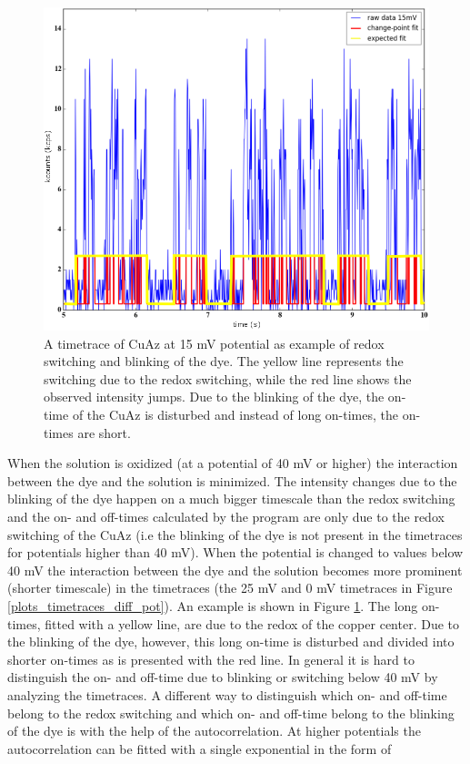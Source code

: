 \documentclass[twoside,single]{lion-msc}
\begin{document}
\begin{figure}[ht!]
\centering
\includegraphics[width=\textwidth]{expected_fits}
\caption{A timetrace of CuAz at 15 mV potential as example of redox switching and blinking of the dye. The yellow line represents the switching due to the redox switching, while the red line shows the observed intensity jumps. Due to the blinking of the dye, the on-time of the CuAz is disturbed and instead of long on-times, the on-times are short.}
\label{expected_fit}
\end{figure}
When the solution is oxidized (at a potential of 40 mV or higher) the interaction between the dye and the solution is minimized. The intensity changes due to the blinking of the dye happen on a much bigger timescale than the redox switching and the on- and off-times calculated by the program are only due to the redox switching of the CuAz (i.e the blinking of the dye is not present in the timetraces for potentials higher than 40 mV). When the potential is changed to values below 40 mV the interaction between the dye and the solution becomes more prominent (shorter timescale) in the timetraces (the 25 mV and 0 mV timetraces in Figure \ref{plots_timetraces_diff_pot}). An example is shown in Figure \ref{expected_fit}. The long on-times, fitted with a yellow line, are due to the redox of the copper center. Due to the blinking of the dye, however, this long on-time is disturbed and divided into shorter on-times as is presented with the red line. In general it is hard to distinguish the on- and off-time due to blinking or switching below 40 mV by analyzing the timetraces.  A different way to distinguish which on- and off-time belong to the redox switching and which on- and off-time belong to the blinking of the dye is with the help of the autocorrelation. At higher potentials the autocorrelation can be fitted with a single exponential in the form of
\end{document}
